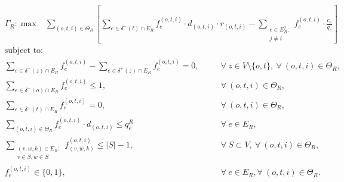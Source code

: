 \documentclass[review]{elsarticle}
\begin{document}
  \begin{align}
        &  \Gamma_R: \max  & \sum_{(o,t,i) \in \Theta_R} \left[\sum_{e \in \delta^-(t)\cap E_R}  f_e^{(o,t,i)} \cdot d_{(o,t,i)} \cdot r_{(o,t,i)} - \sum_{\substack{e \in E_R^j\colon \\ j\not = i}} f_e^{(o,t,i)} \cdot \frac{c_e}{q_e} \right] &&   
    \end{align}
    \begin{align}
        & \text{subject to:}       && \nonumber\\
        & \sum_{e \in \delta^-(z)\cap E_R} f_e^{(o,t,i)}-\sum_{e \in \delta^+(z)\cap E_R} f_{e}^{(o,t,i)}  = 0,           \quad && \forall\ z\in V\setminus\{o,t\},\ \forall\ (o,t,i)\in\Theta_R, \\[1em]
& \sum_{e \in \delta^+(o)\cap E_R} f_e^{(o,t,i)}\leq 1, && \forall\ (o,t,i)\in \Theta_R,  \\
& \sum_{e \in \delta^+(t)\cap E_R} f_e^{(o,t,i)}  = 0, && \forall\ (o,t,i)\in \Theta_R,  \\
 & \sum_{(o,t,i) \in \Theta_R} f_e^{(o,t,i)}\cdot d_{(o,t,i)} \leq q_e^R   &&\forall\ e \in E_R,   \\
& \sum_{\substack{(v,w,k)\in E_R\colon\\v\in S,w \in S }} f_{(v,w,k)}^{(o,t,i)} \leq |S| -1,  && \forall\ S \subset V, \ \forall\ (o,t,i) \in \Theta_R, \\
& f_e^{(o,t,i)} \in \{0,1\},    && \forall\ e \in E_R, \forall\ (o,t,i) \in \Theta_R.
    \end{align}
\end{document}
